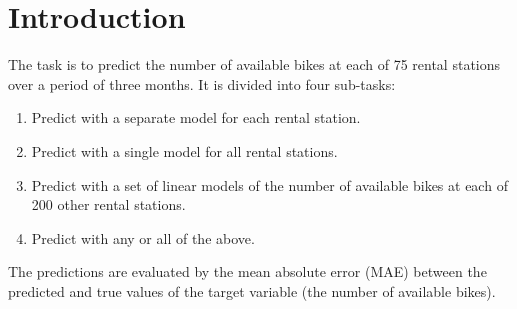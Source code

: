 \section{Introduction}

The task is to predict the number of available bikes at each of 75 rental
stations over a period of three months.
It is divided into four sub-tasks:
\begin{enumerate}
  \item Predict with a separate model for each rental station.
  \item Predict with a single model for all rental stations.
  \item Predict with a set of linear models of the number of available bikes at
        each of 200 other rental stations.
  \item Predict with any or all of the above.
\end{enumerate}
The predictions are evaluated by the mean absolute error (MAE) between the
predicted and true values of the target variable (the number of available
bikes).

